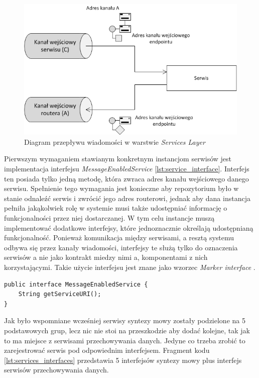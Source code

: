 \begin{figure}[!h]
	\centering
	\includegraphics[scale=0.85]{services_layer_flow.png}
	\caption{Diagram przepływu wiadomości w warstwie \textit{Services Layer}}\label{fig:services_layer_project}
\end{figure}

Pierwszym wymaganiem stawianym konkretnym instancjom serwisów jest implementacja interfejsu \textit{MessageEnabledService} \ref{lst:service_interface}. Interfejs ten posiada tylko jedną metodę, która zwraca adres kanału wejściowego danego serwisu. Spełnienie tego wymagania jest konieczne aby repozytorium było w stanie odnaleźć serwis i zwrócić jego adres routerowi, jednak aby dana instancja pełniła jakąkolwiek rolę w systemie musi także udostępniać informację o funkcjonalności przez niej dostarczanej. W tym celu instancje muszą implementować dodatkowe interfejsy, które jednoznacznie określają udostępnianą funkcjonalność. Ponieważ komunikacja między serwisami, a resztą systemu odbywa się przez kanały wiadomości, interfejsy te służą tylko do oznaczenia serwisów a nie jako kontrakt miedzy nimi a, komponentami z nich korzystającymi. Takie użycie interfejsu jest znane jako wzorzec \textit{Marker interface} \cite{bloch2008}.

\lstset{language=Java, tabsize=4, caption=Definicja interfejsu MessageEnabledService w języku Java.,label=lst:service_interface}

\begin{center}
\begin{lstlisting}
public interface MessageEnabledService {
	String getServiceURI();
}
\end{lstlisting}
\end{center}

Jak było wspomniane wcześniej serwisy syntezy mowy zostały podzielone na 5 podstawowych grup, lecz nic nie stoi na przeszkodzie aby dodać kolejne, tak jak to ma miejsce z serwisami przechowywania danych. Jedyne co trzeba zrobić to zarejestrować serwis pod odpowiednim interfejsem. Fragment kodu \ref{lst:services_interfaces} przedstawia 5 interfejsów syntezy mowy plus interfejs serwisów przechowywania danych.

